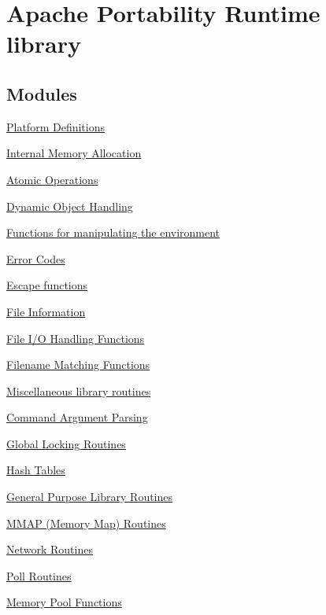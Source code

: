 \hypertarget{group___a_p_r}{\section{Apache Portability Runtime library}
\label{group___a_p_r}
}
\subsection*{Modules}
\begin{DoxyCompactItemize}
\item 
\hyperlink{group__apr__platform}{Platform Definitions}
\item 
\hyperlink{group__apr__allocator}{Internal Memory Allocation}
\item 
\hyperlink{group__apr__atomic}{Atomic Operations}
\item 
\hyperlink{group__apr__dso}{Dynamic Object Handling}
\item 
\hyperlink{group__apr__env}{Functions for manipulating the environment}
\item 
\hyperlink{group__apr__errno}{Error Codes}
\item 
\hyperlink{group___a_p_r___util___escaping}{Escape functions}
\item 
\hyperlink{group__apr__file__info}{File Information}
\item 
\hyperlink{group__apr__file__io}{File I/\-O Handling Functions}
\item 
\hyperlink{group__apr__fnmatch}{Filename Matching Functions}
\item 
\hyperlink{group__apr__general}{Miscellaneous library routines}
\item 
\hyperlink{group__apr__getopt}{Command Argument Parsing}
\item 
\hyperlink{group___a_p_r___global_mutex}{Global Locking Routines}
\item 
\hyperlink{group__apr__hash}{Hash Tables}
\item 
\hyperlink{group__apr__lib}{General Purpose Library Routines}
\item 
\hyperlink{group__apr__mmap}{M\-M\-A\-P (\-Memory Map) Routines}
\item 
\hyperlink{group__apr__network__io}{Network Routines}
\item 
\hyperlink{group__apr__poll}{Poll Routines}
\item 
\hyperlink{group__apr__pools}{Memory Pool Functions}
\item 

\end{DoxyCompactItemize}
